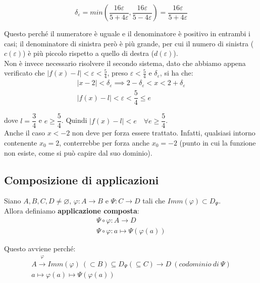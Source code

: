 \documentclass{article}
\begin{document}
\begin{equation*}
    \delta_\varepsilon = min\left(\frac{16\varepsilon}{5+4\varepsilon}, \frac{16\varepsilon}{5-4\varepsilon}\right) = \frac{16\varepsilon}{5+4\varepsilon}
\end{equation*}

\noindent Questo perché il numeratore è uguale e il denominatore è positivo in entrambi i casi; il denominatore di sinistra però è più grande, per cui il numero di sinistra ($c(\varepsilon)$) è più piccolo rispetto a quello di destra ($d(\varepsilon)$).\\
\noindent Non è invece necessario risolvere il secondo sistema, dato che abbiamo appena verificato che $|f(x) - l| < \varepsilon < \frac{5}{4}$, preso $\varepsilon < \frac{5}{4}$ e $\delta_\varepsilon$, si ha che:
\begin{gather*}
    |x - 2| < \delta_\varepsilon \implies 2 - \delta_\varepsilon < x < 2 + \delta_\varepsilon \\
    |f(x) - l| < \varepsilon < \dfrac{5}{4} \leq e
\end{gather*}

\noindent dove $l = \dfrac{3}{4}$ e $e \geq \dfrac{5}{4}$. Quindi $|f(x) - l| < e \quad \forall e \geq \dfrac{5}{4}$. \\

\noindent Anche il caso $x < - 2$ non deve per forza essere trattato. Infatti, qualsiasi intorno contenente $x_0 = 2$, conterrebbe per forza anche $x_0 = -2$ (punto in cui la funzione non esiste, come si può capire dal suo dominio). 

\subsection{Composizione di applicazioni}
Siano $A, B, C, D \neq \varnothing$, $\varphi: A \xrightarrow{} B$ e $\Psi: C \xrightarrow{} D$ tali che $Imm(\varphi) \subset D_\Psi$.\\
Allora definiamo \textbf{applicazione composta}:
\begin{gather*}
    \Psi \circ \varphi: A \xrightarrow{} D \\
    \Psi \circ \varphi: a \longmapsto \Psi(\varphi(a))
\end{gather*}

\noindent Questo avviene perché:
\begin{gather*}
    A \overset{\varphi}{\xrightarrow{}} Imm(\varphi) \ (\subset B) \subseteq D_\Psi (\subseteq C) \xrightarrow{} D \ (codominio \ di \ \Psi)\\
    a \longmapsto \varphi(a) \longmapsto \Psi(\varphi(a))
\end{gather*}
\end{document}
